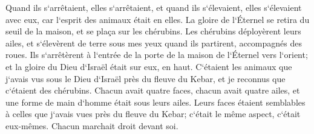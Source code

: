 \verse Quand ils s`arrêtaient, elles s`arrêtaient, et quand ils s`élevaient, elles s`élevaient avec eux, car l`esprit des animaux était en elles. 
\verse La gloire de l`Éternel se retira du seuil de la maison, et se plaça sur les chérubins. 
\verse Les chérubins déployèrent leurs ailes, et s`élevèrent de terre sous mes yeux quand ils partirent, accompagnés des roues. Ils s`arrêtèrent à l`entrée de la porte de la maison de l`Éternel vers l`orient; et la gloire du Dieu d`Israël était sur eux, en haut. 
\verse C`étaient les animaux que j`avais vus sous le Dieu d`Israël près du fleuve du Kebar, et je reconnus que c`étaient des chérubins. 
\verse Chacun avait quatre faces, chacun avait quatre ailes, et une forme de main d`homme était sous leurs ailes. 
\verse Leurs faces étaient semblables à celles que j`avais vues près du fleuve du Kebar; c`était le même aspect, c`était eux-mêmes. Chacun marchait droit devant soi. 

